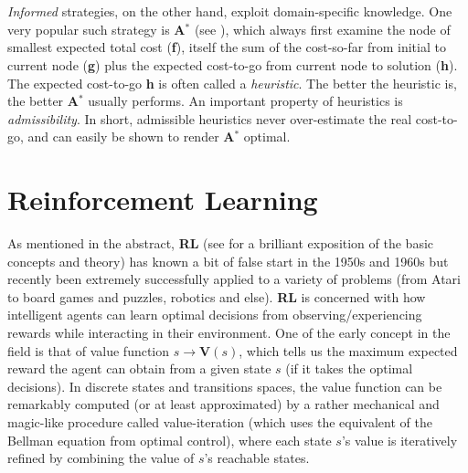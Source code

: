 \\
\\
\textit{Informed} strategies, on the other hand, exploit domain-specific knowledge. One very popular such strategy is \textbf{A$^{*}$} (see \cite{DBLP:journals/jacm/DechterP85}), which always first examine the node of smallest expected total cost (\textbf{f}), itself the sum of the cost-so-far from initial to current node (\textbf{g}) plus the expected cost-to-go from current node to solution (\textbf{h}). The expected cost-to-go \textbf{h} is often called a \textit{heuristic}. The better the heuristic is, the better \textbf{A$^{*}$} usually performs. An important property of heuristics is \textit{admissibility}. In short, admissible heuristics never over-estimate the real cost-to-go, and can easily be shown to render \textbf{A$^{*}$} optimal.




\section{Reinforcement Learning}

As mentioned in the abstract, \textbf{RL} (see \cite{Sutton1998} for a brilliant exposition of the basic concepts and theory) has known a bit of false start in the 1950s and 1960s but recently been extremely successfully applied to a variety of problems (from Atari to board games and puzzles, robotics and else). \textbf{RL} is concerned with how intelligent agents can learn optimal decisions from observing/experiencing rewards while interacting in their environment. One of the early concept in the field is that of value function $s \to \textbf{V}(s)$, which tells us the maximum expected reward the agent can obtain from a given state $s$ (if it takes the optimal decisions). In discrete states and transitions spaces, the value function can be remarkably computed (or at least approximated) by a rather mechanical and magic-like procedure called value-iteration (which uses the equivalent of the Bellman equation from optimal control), where each state $s$'s value is iteratively refined by combining the value of $s$'s reachable states.






